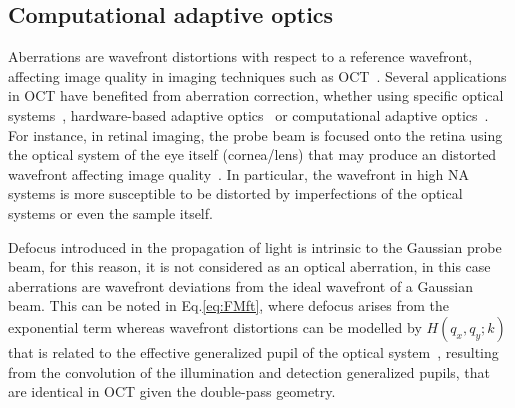 \subsection{Computational adaptive optics}\label{sec:CAO}

Aberrations are wavefront distortions with respect to a reference wavefront, affecting image quality in imaging techniques such as OCT~\cite{Pircher2017_Review}. Several applications in OCT have benefited from aberration correction, whether using specific optical systems~\cite{Meemon2008_Optical, Xi2009_Highresolution,Mo2013_FocusExtension, Bo2017_Depthoffocus}, hardware-based adaptive optics~\cite{Zawadzki2005_Adaptiveoptics, Zhang2006_Highspeed} or computational adaptive optics~\cite{Kumar2017_Invivo, Hillmann2016_Aberrationfree, Fechtig2014_Line, Wu2019_Computed}. For instance, in retinal imaging, the probe beam is focused onto the retina using the optical system of the eye itself (cornea/lens) that may produce an distorted wavefront affecting image quality~\cite{Liang1997_Aberrations}. In particular, the wavefront in high NA systems is more susceptible to be distorted by imperfections of the optical systems or even the sample itself.

Defocus introduced in the propagation of light is intrinsic to the Gaussian probe beam, for this reason, it is not considered as an optical aberration, in this case aberrations are wavefront deviations from the ideal wavefront of a Gaussian beam. This can be noted in Eq.\eqref{eq:FMft}, where defocus arises from the exponential term whereas wavefront distortions can be modelled by $H(q_x, q_y; k)$ that is related to the effective generalized pupil of the optical system~\cite{Liu2017_Computational}, resulting from the convolution of the illumination and detection generalized pupils, that are identical in OCT given the double-pass geometry.

